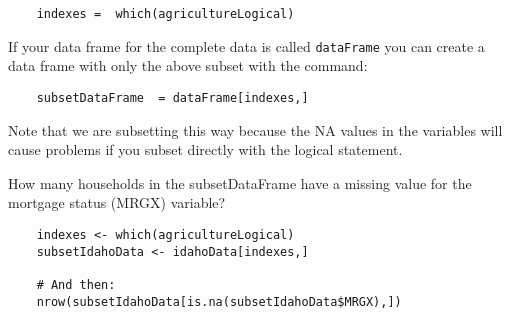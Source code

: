 \documentclass{beamer}
\begin{document}
\begin{frame}[fragile]
	
\begin{framed} 
\begin{verbatim}
	indexes =  which(agricultureLogical) 
\end{verbatim}
\end{framed} 

If your data frame for the complete data is called \texttt{dataFrame} you can create a data frame 
with only the above subset with the command: 

\end{frame}
\begin{frame}[fragile]
	
\begin{framed} 
	\begin{verbatim}
	subsetDataFrame  = dataFrame[indexes,] 
	\end{verbatim}
\end{framed} 

\noindent Note that we are subsetting this way because the NA values in the variables 
will cause problems if you subset directly with the logical statement. 

\end{frame}

\begin{frame}[fragile]
	
\noindent How many households in the subsetDataFrame have a missing value for the mortgage status 
(MRGX) variable?

\begin{framed} 
	\begin{verbatim}
	indexes <- which(agricultureLogical)
	subsetIdahoData <- idahoData[indexes,]
	
	# And then:
	nrow(subsetIdahoData[is.na(subsetIdahoData$MRGX),])
	\end{verbatim}
\end{framed} 

\end{frame}
\end{document}
